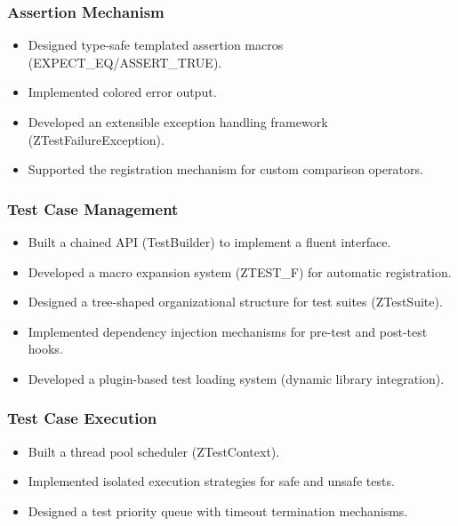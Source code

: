 \documentclass[english]{article}
\begin{document}
\subsubsection*{Assertion Mechanism}
\begin{itemize}[leftmargin=1em,itemsep=0.5ex]
    \item Designed type-safe templated assertion macros (EXPECT\_EQ/ASSERT\_TRUE).
    \item Implemented colored error output.
    \item Developed an extensible exception handling framework (ZTestFailureException).
    \item Supported the registration mechanism for custom comparison operators.
\end{itemize}

\subsubsection*{Test Case Management}
\begin{itemize}[leftmargin=1em,itemsep=0.5ex]
    \item Built a chained API (TestBuilder) to implement a fluent interface.
    \item Developed a macro expansion system (ZTEST\_F) for automatic registration.
    \item Designed a tree-shaped organizational structure for test suites (ZTestSuite).
    \item Implemented dependency injection mechanisms for pre-test and post-test hooks.
    \item Developed a plugin-based test loading system (dynamic library integration).
\end{itemize}

\subsubsection*{Test Case Execution}
\begin{itemize}[leftmargin=1em,itemsep=0.5ex]
    \item Built a thread pool scheduler (ZTestContext).
    \item Implemented isolated execution strategies for safe and unsafe tests.
    \item Designed a test priority queue with timeout termination mechanisms.
\end{itemize}
\end{document}
